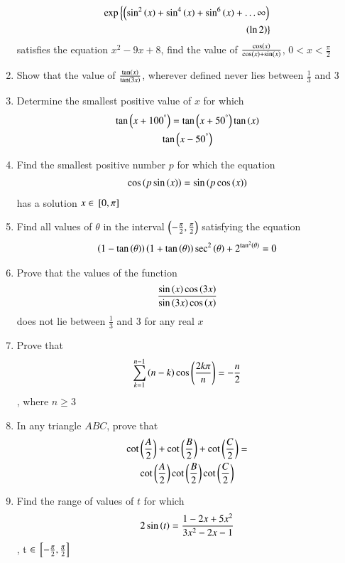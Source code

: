 \documentclass[journal,12pt,article,twocolumn]{IEEEtran}
\theoremstyle{remark}
\begin{document}
\begin{enumerate}
\begin{align*}
	\exp \left\{\left(\sin^2\left(x\right)+\sin^4\left(x\right)+\sin^6\left(x\right)+\dots\infty\right)\right.\\
	\left. \left(\ln 2\right)\right\}
\end{align*}
satisfies the equation $x^2-9x+8$, find the value of $\frac{\cos \left(x\right)}{\cos \left(x\right) + \sin \left(x\right)}$, $0<x<\frac{\pi}{2}$
\hfill{}
\item Show that the value of  $\frac{\tan \left(x\right)}{\tan \left(3x\right)}$, wherever defined never lies between $\frac{1}{3}$ and 3
\hfill{}
\item Determine the smallest positive value of $x$  for which 
\begin{multline*}
\tan {\ensuremath{\left(x+100^{\degree}\right)}}=\tan {\ensuremath{\left(x+50^{\degree}\right)}}\tan \left(x\right)\\\tan {\ensuremath{\left(x-50^{\degree}\right)}}
\end{multline*}
\hfill{}
\item Find the smallest positive number $p$ for which the equation 
\begin{align*}
\cos {\ensuremath{\left(p\sin \left(x\right)\right)}}=\sin {\ensuremath{\left(p\cos \left(x\right)\right)}}
\end{align*}
has a solution $ x \in {}\left[0, \pi\right]$
\hfill{}
\item Find all values of $\theta$ in the interval $\left(-\frac{\pi}{2},\frac{\pi}{2}\right)$ satisfying the equation 
\begin{align*}
\left(1-\tan \left(\theta\right)\right)\left(1+\tan \left(\theta\right)\right)\sec^2\left(\theta\right)+ 2^{\tan^2\left(\theta\right)}=0
\end{align*}
\hfill{}
\item Prove that the values of the function 
\begin{align*}
\frac{\sin \left(x\right) \cos \left(3x\right)}{\sin \left(3x\right) \cos \left(x\right)}
\end{align*}
does not lie between $\frac{1}{3}$ and 3 for any real $x$\\
\hfill{}
\item Prove that 
\begin{align*}
\sum_{k=1}^{n-1} \left(n-k\right)\cos\left( \frac{2k\pi}{n}\right)=-\frac{n}{2}
\end{align*}
, where $n\ge3$
\hfill{}
\item In any triangle $ABC$, prove that 
\begin{multline*}
\cot \left(\frac{A}{2}\right)+\cot \left(\frac{B}{2}\right)+\cot \left(\frac{C}{2}\right)=\\\cot \left(\frac{A}{2}\right)\cot \left(\frac{B}{2}\right)\cot \left(\frac{C}{2}\right)
\end{multline*}
\hfill{}
\item Find the range of values of $t$ for which 
\begin{align*}
2\sin \left(t\right) = \frac{1-2x+5x^2}{3x^2-2x-1}
\end{align*}
, t $\in {}\left[-\frac{\pi}{2},\frac{\pi}{2}\right]$
\hfill{}
\end{enumerate}
\end{document}
